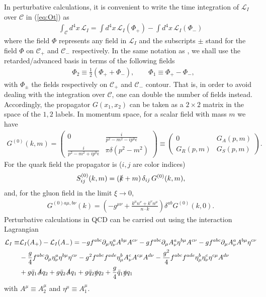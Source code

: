 \documentclass[onecolumn,showpacs,nobibnotes,nofootinbib,12pt,aps,prd,showpacs,notitlepage,nofootinbib,preprintnumbers,amsmath,amssymb]{article}
\begin{document}
In perturbative calculations, it is convenient to write the time
integration of $\mathcal{L}_I$ over $\mathcal{C}$ in (\ref{eq:Ot}) as
\begin{align}
  \int_{\mathcal{C}} d^4 x \, \mathcal{L}_I=\int d^4 x \,
  \mathcal{L}_I(\Phi_+) - \int d^4 x \, \mathcal{L}_I(\Phi_-)
\end{align} 
where the field $\Phi$ represents any field in $\mathcal{L}_I$ and the
subscripts $\pm$ stand for the field $\Phi$ on $\mathcal{C}_+$ and
$\mathcal{C}_-$ respectively. In the same notation as
\cite{Epelbaum:2014yja}, we shall use the retarded/advanced basis in
terms of the following fields
\begin{align}
  &\Phi_2\equiv \frac{1}{2}(\Phi_+ + \Phi_-),\qquad \Phi_1\equiv
  \Phi_+ - \Phi_- ,
\end{align}
with $\Phi_\pm$ the fields respectively on $\mathcal{C}_+$ and
$\mathcal{C}_-$ contour. That is, in order to avoid dealing with the
integration over $\mathcal{C}$, one can double the number of fields
instead. Accordingly, the propagator $G(x_1,x_2)$ can be taken as a
$2\times 2$ matrix in the space of the $1,2$ labels. In momentum
space, for a scalar field with mass $m$ we have
\begin{align}\label{eq:Gra}
G^{(0)}(k,m) =
\left(\begin{array}{cc}
0&\frac{i}{p^2-m^2-ip^0 \epsilon}\\
\frac{i}{p^2-m^2+ip^0 \epsilon}&\pi\delta(p^2-m^2)
\end{array}\right)
\equiv
\left(\begin{array}{cc}
0&G_A(p,m)\\
G_R(p,m)&G_S(p,m)
\end{array}\right) .
\end{align}
For the quark field the propagator is ($i,j$ are color indices)
\begin{align}
S_{ij}^{(0)}(k,m)=(\slashed{k}+m) \, \delta_{ij} \, G^{(0)} (k,m),\label{eq:Gq}
\end{align}
and, for the gluon field in the limit $\xi\to0$,
\begin{align}
  G^{(0)a\mu,b\nu}(k)=\left(-g^{\mu\nu}+\frac{k^\mu n^\nu+k^\nu
      n^\mu}{n\cdot k}\right)\delta^{ab} G^{(0)}(k,0).\label{eq:Gg}
\end{align}
Perturbative calculations in QCD can be carried out using the
interaction Lagrangian \cite{Jeon:2013zga}
\begin{align}\label{eq:LSK}
  \mathcal{L}_{I} \equiv & \mathcal{L}_{I} (A_+) - \mathcal{L}_{I} (A_-) = -g f^{abc}\partial_\mu\eta^a_\nu A^{b\mu} A^{c\nu}-g f^{abc}\partial_\mu A^a_\nu \eta^{b\mu} A^{c\nu}-g f^{abc}\partial_\mu A^a_\nu A^{b\mu} \eta^{c\nu}\nonumber\\
  &-\frac{g}{4} f^{abc}\partial_\mu \eta^a_\nu \eta^{b\mu} \eta^{c\nu}-g^2 f^{abc}f^{ade} \eta^b_\mu A^c_\nu A^{c\mu} A^{d\nu}-\frac{g^2}{4} f^{abc}f^{ade} \eta^b_\mu \eta^c_\nu \eta^{c\mu} A^{d\nu}\nonumber\\
  &+g\bar q_1 \slashed{A} q_2+g\bar q_2 \slashed{A} q_1+g\bar q_2
  \slashed{\eta} q_2+\frac{g}{4}\bar q_1 \slashed{\eta} q_1
\end{align}
with $A^\mu\equiv A_2^\mu$ and $\eta^\mu\equiv A_1^\mu$.
\end{document}
